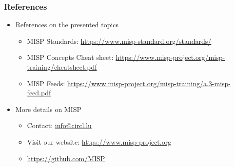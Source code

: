 \begin{frame}
    \frametitle{References}
    \begin{itemize}
        \item References on the presented topics
        \begin{itemize}
            \item MISP Standards: \url{https://www.misp-standard.org/standards/}
            \item MISP Concepts Cheat sheet: \url{https://www.misp-project.org/misp-training/cheatsheet.pdf}
            \item MISP Feeds: \url{https://www.misp-project.org/misp-training/a.3-misp-feed.pdf}
        \end{itemize}
        \item More details on MISP
        \begin{itemize}
            \item Contact: \url{info@circl.lu}
            \item Visit our website: \url{https://www.misp-project.org}
            \item \url{https://github.com/MISP}
        \end{itemize}
    \end{itemize}
\end{frame}
